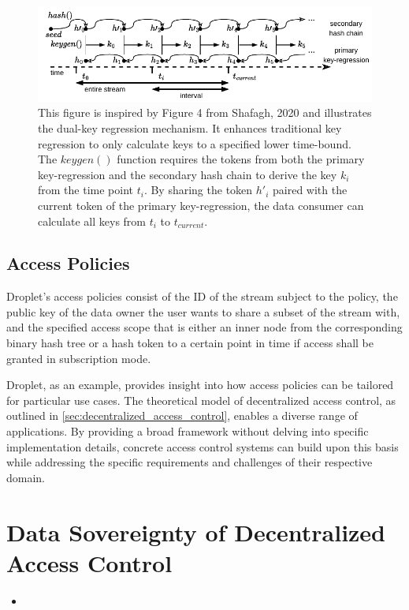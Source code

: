\documentclass[conference]{IEEEtran}
\begin{document}
\begin{figure}[htbp]
  \centering
  \includegraphics[width=\linewidth]{figures/dual_key_regression.pdf}
  \caption{
    This figure is inspired by Figure 4 from Shafagh, 2020 \cite{shafagh_droplet_2020} and illustrates the dual-key regression mechanism.
    It enhances traditional key regression to only calculate keys to a specified lower time-bound.
    The $keygen()$ function requires the tokens from both the primary key-regression and the secondary hash chain to derive the key $k_i$ from the time point $t_i$.
    By sharing the token $h'_i$ paired with the current token of the primary key-regression, the data consumer can calculate all keys from $t_i$ to $t_{current}$. 
  }
  \label{fig:dual_key_regression}
\end{figure}

\subsection{Access Policies}
Droplet's access policies consist of the ID of the stream subject to the policy, the public key of the data owner the user wants to share a subset of the stream with, and the specified access scope that is either an inner node from the corresponding binary hash tree or a hash token to a certain point in time if access shall be granted in subscription mode.

Droplet, as an example, provides insight into how access policies can be tailored for particular use cases.
The theoretical model of decentralized access control, as outlined in \autoref{sec:decentralized_access_control}, enables a diverse range of applications.
By providing a broad framework without delving into specific implementation details, concrete access control systems can build upon this basis while addressing the specific requirements and challenges of their respective domain.

\section{Data Sovereignty of Decentralized Access Control}
\begin{itemize}
  \item 
\end{itemize}



\end{document}
